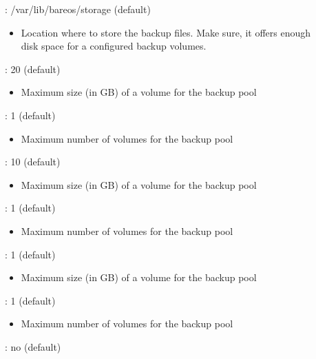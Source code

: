   \begin{description}
    \item[]: /var/lib/bareos/storage (default)
      \begin{itemize}
	\item Location where to store the backup files. Make sure, it offers enough disk space for a configured backup volumes.
      \end{itemize}    
    \item[]: 20 (default)
      \begin{itemize}
	\item Maximum size (in GB) of a volume for the  backup pool
      \end{itemize}
    \item[]: 1 (default)
     \begin{itemize}
	\item Maximum number of volumes for the  backup pool
      \end{itemize}
    \item[]: 10 (default)
      \begin{itemize}
	\item Maximum size (in GB) of a volume for the  backup pool
      \end{itemize}
    \item[]: 1 (default)
      \begin{itemize}
	\item Maximum number of volumes for the  backup pool
      \end{itemize}
    \item[]: 1 (default)
      \begin{itemize}
	\item Maximum size (in GB) of a volume for the  backup pool
      \end{itemize}
    \item[]: 1 (default)
      \begin{itemize}
	\item Maximum number of volumes for the  backup pool
      \end{itemize}
    \item[]: no (default)
      \begin{description}

\end{description}
\end{description}
